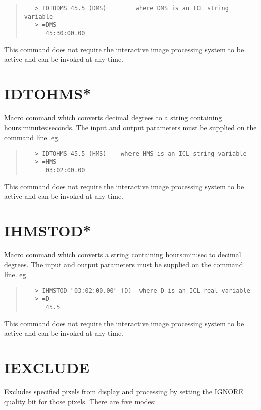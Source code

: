 \documentclass{book}
\renewcommand{\_}{{\tt\char'137}}     %
\begin{document}
\begin{quote}\begin{verbatim}
   > IDTODMS 45.5 (DMS)        where DMS is an ICL string variable
   > =DMS
      45:30:00.00
 \end{verbatim}\end{quote}
This command does not require the interactive image processing
system to be active and can be invoked at any time.

\section{IDTOHMS*}
Macro command which converts decimal degrees to a string containing
hours:minutes:seconds. The input and output parameters must be
supplied on the command line. eg.

\begin{quote}\begin{verbatim}
   > IDTOHMS 45.5 (HMS)    where HMS is an ICL string variable
   > =HMS
      03:02:00.00
 \end{verbatim}\end{quote}
This command does not require the interactive image processing
system to be active and can be invoked at any time.

\section{IHMSTOD*}
Macro command which converts a string containing hours:min:sec to
decimal degrees. The input and output parameters must be supplied
on the command line. eg.

\begin{quote}\begin{verbatim}
   > IHMSTOD "03:02:00.00" (D)  where D is an ICL real variable
   > =D
      45.5
 \end{verbatim}\end{quote}
This command does not require the interactive image processing
system to be active and can be invoked at any time.

\section{IEXCLUDE}
Excludes specified pixels from display and processing by setting
the IGNORE quality bit for those pixels. There are five modes:
\end{document}
